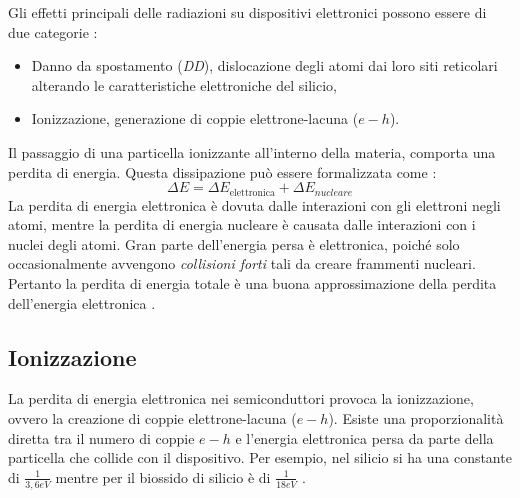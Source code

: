 
Gli effetti principali delle radiazioni su dispositivi elettronici possono essere di due categorie \cite{bib:Effetti_Radiazioni_1987}:
\begin{itemize}
	\item Danno da spostamento {(\textit{DD})}, dislocazione degli atomi dai loro siti reticolari alterando le caratteristiche elettroniche del silicio,
	\item Ionizzazione, generazione di coppie elettrone-lacuna ($e-h$).
\end{itemize}

\vspace{0.5cm}

Il passaggio di una particella ionizzante all'interno della materia, comporta una perdita di energia. Questa dissipazione può essere formalizzata come :
$$ \Delta E = \Delta E_{\text{elettronica}} + \Delta E_{nucleare} $$
La perdita di energia elettronica è dovuta dalle interazioni con gli elettroni negli atomi, mentre la perdita di energia nucleare è causata dalle interazioni con i nuclei degli atomi.
Gran parte dell'energia persa è elettronica, poiché solo occasionalmente avvengono \textit{collisioni forti} tali da creare frammenti nucleari. Pertanto la perdita di energia totale è una buona approssimazione della perdita dell'energia elettronica \cite{bib:Effetti_Radiazioni_NASA}.

\vspace{0.5cm}

\subsection{Ionizzazione}\label{cap1:ionizzazione}
La perdita di energia elettronica  nei semiconduttori provoca la ionizzazione, ovvero la creazione di coppie elettrone-lacuna ($e-h$). Esiste una proporzionalità diretta tra il numero di coppie $e-h$ e l'energia elettronica persa da parte della particella che collide con il dispositivo. Per esempio, nel silicio si ha una constante di $\frac{1}{3,6eV}$ mentre per il biossido di silicio è di $\frac{1}{18eV}$ \cite{bib:Effetti_Radiazioni_NASA}.

\vspace{0.5cm}

